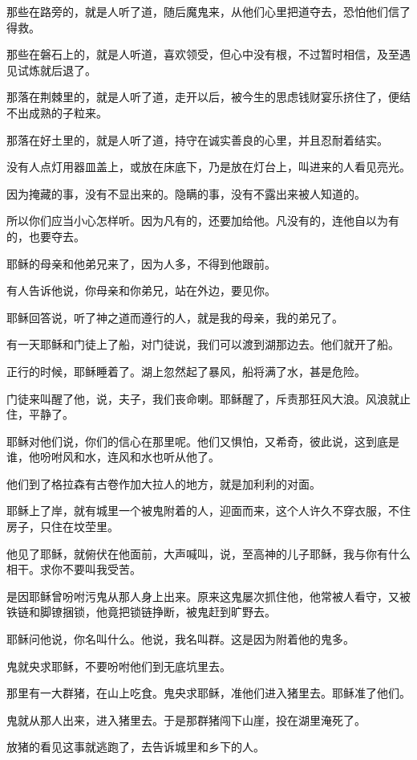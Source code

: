 \documentclass[12pt,oneside]{book}
\begin{document}
那些在路旁的，就是人听了道，随后魔鬼来，从他们心里把道夺去，恐怕他们信了得救。

那些在磐石上的，就是人听道，喜欢领受，但心中没有根，不过暂时相信，及至遇见试炼就后退了。

那落在荆棘里的，就是人听了道，走开以后，被今生的思虑钱财宴乐挤住了，便结不出成熟的子粒来。

那落在好土里的，就是人听了道，持守在诚实善良的心里，并且忍耐着结实。

没有人点灯用器皿盖上，或放在床底下，乃是放在灯台上，叫进来的人看见亮光。

因为掩藏的事，没有不显出来的。隐瞒的事，没有不露出来被人知道的。

所以你们应当小心怎样听。因为凡有的，还要加给他。凡没有的，连他自以为有的，也要夺去。

耶稣的母亲和他弟兄来了，因为人多，不得到他跟前。

有人告诉他说，你母亲和你弟兄，站在外边，要见你。

耶稣回答说，听了神之道而遵行的人，就是我的母亲，我的弟兄了。

有一天耶稣和门徒上了船，对门徒说，我们可以渡到湖那边去。他们就开了船。

正行的时候，耶稣睡着了。湖上忽然起了暴风，船将满了水，甚是危险。

门徒来叫醒了他，说，夫子，我们丧命喇。耶稣醒了，斥责那狂风大浪。风浪就止住，平静了。

耶稣对他们说，你们的信心在那里呢。他们又惧怕，又希奇，彼此说，这到底是谁，他吩咐风和水，连风和水也听从他了。

他们到了格拉森有古卷作加大拉人的地方，就是加利利的对面。

耶稣上了岸，就有城里一个被鬼附着的人，迎面而来，这个人许久不穿衣服，不住房子，只住在坟茔里。

他见了耶稣，就俯伏在他面前，大声喊叫，说，至高神的儿子耶稣，我与你有什么相干。求你不要叫我受苦。

是因耶稣曾吩咐污鬼从那人身上出来。原来这鬼屡次抓住他，他常被人看守，又被铁链和脚镣捆锁，他竟把锁链挣断，被鬼赶到旷野去。

耶稣问他说，你名叫什么。他说，我名叫群。这是因为附着他的鬼多。

鬼就央求耶稣，不要吩咐他们到无底坑里去。

那里有一大群猪，在山上吃食。鬼央求耶稣，准他们进入猪里去。耶稣准了他们。

鬼就从那人出来，进入猪里去。于是那群猪闯下山崖，投在湖里淹死了。

放猪的看见这事就逃跑了，去告诉城里和乡下的人。
\end{document}
